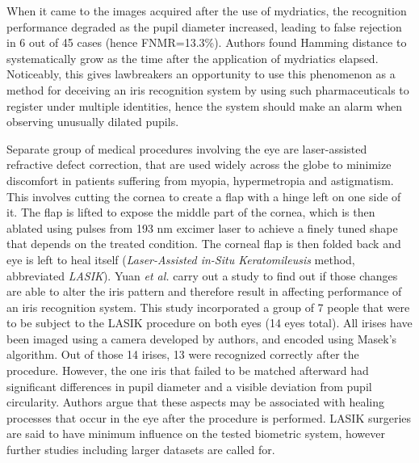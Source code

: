 \documentclass[a4paper]{spie}
\begin{document}
When it came to the images acquired after the use of mydriatics, the recognition performance degraded as the pupil diameter increased, leading to false rejection in 6 out of 45 cases (hence FNMR=13.3\%). Authors found Hamming distance to systematically grow as the time after the application of mydriatics elapsed. Noticeably, this gives lawbreakers an opportunity to use this phenomenon as a method for deceiving an iris recognition system by using such pharmaceuticals to register under multiple identities, hence the system should make an alarm when observing unusually dilated pupils.

Separate group of medical procedures involving the eye are laser-assisted refractive defect correction, that are used widely across the globe to minimize discomfort in patients suffering from myopia, hypermetropia and astigmatism. This involves cutting the cornea to create a flap with a hinge left on one side of it. The flap is lifted to expose the middle part of the cornea, which is then ablated using pulses from 193 nm excimer laser to achieve a finely tuned shape that depends on the treated condition. The corneal flap is then folded back and eye is left to heal itself (\emph{Laser-Assisted in-Situ Keratomileusis} method, abbreviated \emph{LASIK}). Yuan \emph{et al.} \cite{Yuan} carry out a study to find out if those changes are able to alter the iris pattern and therefore result in affecting performance of an iris recognition system. This study incorporated a group of 7 people that were to be subject to the LASIK procedure on both eyes (14 eyes total). All irises have been imaged using a camera developed by authors, and encoded using Masek's algorithm. Out of those 14 irises, 13 were recognized correctly after the procedure. However, the one iris that failed to be matched afterward had significant differences in pupil diameter and a visible deviation from pupil circularity. Authors argue that these aspects may be associated with healing processes that occur in the eye after the procedure is performed. LASIK surgeries are said to have minimum influence on the tested biometric system, however further studies including larger datasets are called for.
\end{document}
